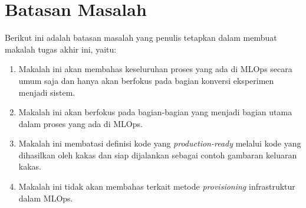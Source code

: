 \section{Batasan Masalah}

Berikut ini adalah batasan masalah yang penulis tetapkan dalam membuat makalah tugas akhir ini, yaitu:

\begin{enumerate}
  \item Makalah ini akan membahas keseluruhan proses yang ada di MLOps secara umum saja dan hanya akan berfokus pada bagian konversi eksperimen menjadi sistem.
  \item Makalah ini akan berfokus pada bagian-bagian yang menjadi bagian utama dalam proses yang ada di MLOps.
  \item Makalah ini membatasi definisi kode yang \textit{production-ready} melalui kode yang dihasilkan oleh kakas dan siap dijalankan sebagai contoh gambaran keluaran kakas.
  \item Makalah ini tidak akan membahas terkait metode \textit{provisioning} infrastruktur dalam MLOps. 
\end{enumerate}